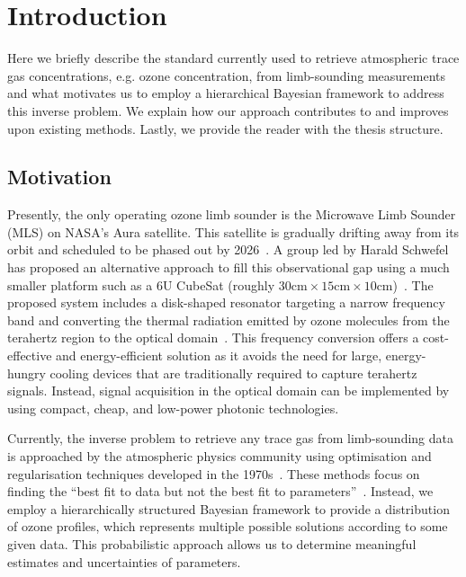 \chapter{Introduction}

Here we briefly describe the standard currently used to retrieve atmospheric trace gas concentrations, e.g. ozone concentration, from limb-sounding measurements and what motivates us to employ a hierarchical Bayesian framework to address this inverse problem.
We explain how our approach contributes to and improves upon existing methods.
Lastly, we provide the reader with the thesis structure.


\section{Motivation}
Presently, the only operating ozone limb sounder is the Microwave Limb Sounder (MLS) on NASA's Aura satellite.
This satellite is gradually drifting away from its orbit and scheduled to be phased out by 2026~\cite{Bryan2024NASA}.
A group led by Harald Schwefel has proposed an alternative approach to fill this observational gap using a much smaller platform such as a 6U CubeSat (roughly $30\text{cm} \times 15\text{cm} \times 10\text{cm}$)~\cite{ustin2024current}. 
The proposed system includes a disk-shaped resonator targeting a narrow frequency band and converting the thermal radiation emitted by ozone molecules from the terahertz region to the optical domain~\cite{Suresh25,Sedlmeir14}. 
This frequency conversion offers a cost-effective and energy-efficient solution as it avoids the need for large, energy-hungry cooling devices that are traditionally required to capture terahertz signals. 
Instead, signal acquisition in the optical domain can be implemented by using compact, cheap, and low-power photonic technologies.

Currently, the inverse problem to retrieve any trace gas from limb-sounding data is approached by the atmospheric physics community using optimisation and regularisation techniques developed in the 1970s~\cite{rodgers1976retrieval, NASA2022MLSv5}.
These methods focus on finding the ``best fit to data but not the best fit to parameters''~\cite{tan2016LecNot}.
Instead, we employ a hierarchically structured Bayesian framework to provide a distribution of ozone profiles, which represents multiple possible solutions according to some given data.
This probabilistic approach allows us to determine meaningful estimates and uncertainties of parameters.

